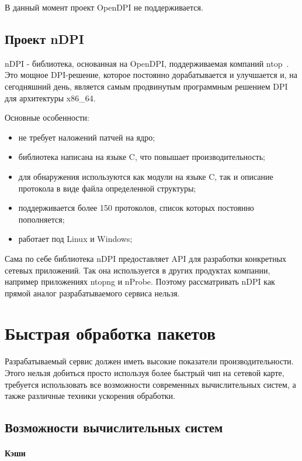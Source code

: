 В данный момент проект OpenDPI не поддерживается.

\subsection{Проект nDPI}
nDPI - библиотека, основанная на OpenDPI, поддерживаемая компаний ntop~\cite{ntop_company}. Это мощное DPI-решение, которое постоянно дорабатывается и улучшается и, на сегодняшний день, является самым продвинутым программным решением DPI для архитектуры x86\_64.

Основные особенности:
\begin{itemize}
\item не требует наложений патчей на ядро;
\item библиотека написана на языке C, что повышает производительность;
\item для обнаружения используются как модули на языке C, так и описание протокола в виде файла определенной структуры;
\item поддерживается более 150 протоколов, список которых постоянно пополняется;
\item работает под Linux и Windows;
\end{itemize}

Сама по себе библиотека nDPI предоставляет API для разработки конкретных сетевых приложений. Так она используется в других продуктах компании, например приложениях ntopng и nProbe. Поэтому рассматривать nDPI как прямой аналог разрабатываемого сервиса нельзя.


\section{Быстрая обработка пакетов}
Разрабатываемый сервис должен иметь высокие показатели производительности. Этого нельзя добиться просто используя более быстрый чип на сетевой карте, требуется использовать все возможности современных вычислительных систем, а также различные техники ускорения обработки.

\subsection{Возможности вычислительных систем}
\paragraph{Кэши}

